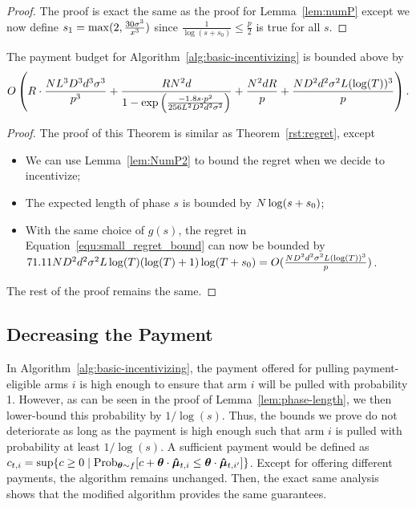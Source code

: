 \begin{proof}
The proof is exact the same as the proof for Lemma~\ref{lem:numP} except we now define $s_1 = \max(2, \frac{30 \sigma^3}{x^3})$ since $\frac{1}{\log(s+s_0)}\leq \frac{p}{2}$ is true for all $s$.
\end{proof}

\begin{theorem}
The payment budget for Algorithm~\ref{alg:basic-incentivizing} is bounded above by 
\begin{align}
O \left(R\cdot \frac{N L^3 D^3 d^3 \sigma^3}{p^3}
  + \frac{R N^2 d}{1 - \exp \left(
    \frac{-1.8 s \cdot p^2}{256 L^2 D^2 d^2 \sigma^2}
  \right)} +\frac{N^2 dR}{p}+\frac{ND^2 d^2\sigma^2 L(\log(T))^3}{p}\right).  \nonumber
\end{align}
\end{theorem}

\begin{proof}
The proof of this Theorem is similar as Theorem~\ref{rst:regret}, except
\begin{itemize}
\item We can use Lemma~\ref{lem:NumP2} to bound the regret when we decide to incentivize;
\item The expected length of phase $s$ is bounded by $N \log(s+s_0)$;
\item With the same choice of $g(s)$, the regret in Equation~\ref{equ:small_regret_bound} can now be bounded by $71.11 ND^2 d^2\sigma^2 L\log(T)(\log(T)+1)\log(T+s_0)=O(\frac{ND^2 d^2\sigma^2 L(\log(T))^3}{p})$.
\end{itemize}
The rest of the proof remains the same.
\end{proof}


\subsection{Decreasing the Payment} \label{sec:pi}

In Algorithm~\ref{alg:basic-incentivizing},
the payment  offered for pulling payment-eligible arms $i$
is high enough to ensure that arm $i$ will be pulled with probability 1.
However, as can be seen in the proof of Lemma~\ref{lem:phase-length},
we then lower-bound this probability by $1/\log(s)$.
Thus, the bounds we prove do not deteriorate as long as the payment is
high enough such that arm $i$ is pulled with probability at least $1/\log(s)$.
A sufficient payment would be defined as
$\Pay{t}{i} = \sup \Set{c \geq 0}{%
  \Prob[\AgV \sim \AgentDist]{c + \AgV \cdot \ArmEV{t}{i} \leq \AgV \cdot \ArmEV{t}{i'}}}$.
Except for offering different payments, the algorithm remains unchanged.
Then, the exact same analysis shows that the modified algorithm
provides the same guarantees.
